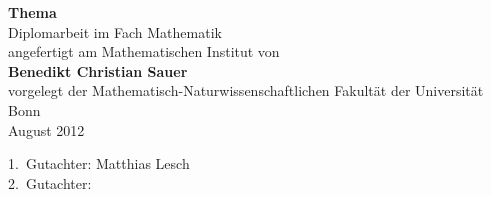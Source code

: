 \documentclass[a4paper,twoside]{scrartcl}
\author{Benedikt Christian Sauer}
\title{\Thema}
\newcommand{\Thema}{Thema}
\begin{document}
\begin{titlepage}
  \begin{center}
    \Huge{\bf\textsf{\Thema}} \\
    \vspace{3cm}
    \Large Diplomarbeit im Fach Mathematik \\
    \vspace{1cm}
    \normalsize angefertigt am Mathematischen Institut von \\
    \vspace{1cm}
    \large{\bf Benedikt Christian Sauer} \\
    \vspace{2cm}
    \normalsize vorgelegt der Mathematisch-Naturwissenschaftlichen Fakultät der Universität
    Bonn \\
    \vspace{1cm}
    \large August 2012
  \end{center}
\end{titlepage}
\newpage
\tableofcontents
\vfill
\begin{center}
  \large 1.\ Gutachter: Matthias Lesch \\
  \large 2.\ Gutachter: \\
\end{center}
\newpage







\begin{appendix}
    
    
\end{appendix}
\end{document}
